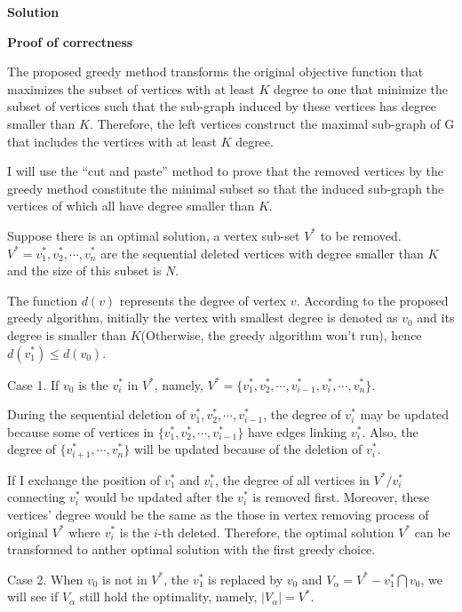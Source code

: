 \noindent
\textbf{Solution}

\vspace{5mm}
\noindent
\textbf{Proof of correctness}

The proposed greedy method transforms the original objective function that maximizes the subset of vertices with at least $K$ degree to one that minimize the subset of vertices such that the sub-graph induced by these vertices has degree smaller than $K$. Therefore, the left vertices construct the maximal sub-graph of G that includes the vertices with at least $K$ degree. 

I will use the ``cut and paste'' method to prove that the removed vertices by the greedy method constitute the minimal subset so that the induced sub-graph the vertices of which all have degree smaller than $K$. 

Suppose there is an optimal solution, a vertex sub-set $V^*$ to be removed. $ V^*= {v_1^*,v_2^*, \cdots, v_n^* }$ are the sequential deleted vertices with degree smaller than $K$ and the size of this subset is $N$.

The function $d(v)$ represents the degree of vertex $v$. According to the proposed greedy algorithm, initially the vertex with smallest degree is denoted as $v_0$ and its degree is smaller than $K$(Otherwise, the greedy algorithm won't run), hence $d(v_1^*) \leq d(v_0) $.

Case 1. If $v_0$ is the $v_i^*$ in $V^*$, namely, $V^*=\{ v_1^*,v_2^*, \cdots, v_{i-1}^* ,v_i^*, \cdots, v_n^* \}$. 

During the sequential deletion of $v_1^*,v_2^*, \cdots, v_{i-1}^*$, the degree of $v_i^*$ may be updated because some of vertices in $\{ v_1^*,v_2^*, \cdots, v_{i-1}^* \}$ have edges linking $v_i^*$. Also, the degree of $\{ v_{i+1}^*, \cdots, v_n^* \}$ will be updated because of the deletion of $v_i^*$. 

If I exchange the position of $v_1^*$ and $v_i^*$, the degree of all vertices in $V^*/v_i^*$ connecting $v_i^*$ would be updated after the $v_i^*$ is removed first. Moreover, these vertices' degree would be the same as the those in vertex removing process of original $V^*$ where $v_i^*$ is the $i$-th deleted. Therefore, the optimal solution $V^*$ can be transformed to anther optimal solution with the first greedy choice.

Case 2. When $v_0$ is not in $V^*$, the $v_1^*$ is replaced by $v_0$ and $V_\alpha= V^*- v_1^* \bigcap v_0 $, we will see if $V_\alpha$ still hold the optimality, namely, $|V_\alpha| = V^*$.

